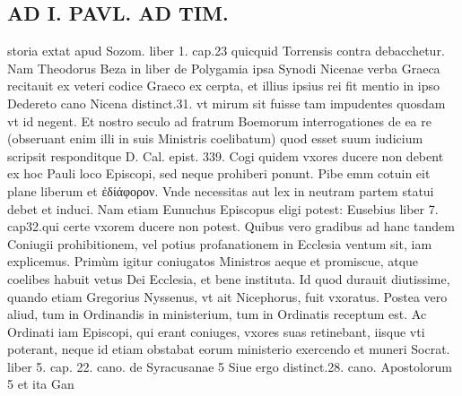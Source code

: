 \documentclass{article}
\begin{document}
\begin{pages}
\section*{AD I. PAVL. AD TIM. }
\marginpar{[ p.112 ]}\pstart storia extat apud Sozom. liber  1. cap.23 quicquid Torrensis contra debacchetur. Nam Theodorus Beza in liber  de Polygamia ipsa Synodi Nicenae verba Graeca recitauit ex veteri codice Graeco ex cerpta, et illius ipsius rei fit mentio in ipso Dedereto cano Nicena distinct.31. vt mirum sit fuisse tam impudentes quosdam vt id negent. Et nostro seculo ad fratrum Boemorum interrogationes de ea re (obseruant enim illi in suis Ministris coelibatum) quod esset suum iudicium scripsit responditque D. Cal. epist. 339.  \pend\pstart Cogi quidem vxores ducere non debent ex hoc Pauli loco Episcopi, sed neque prohiberi ponunt. Pibe emm cotuin eit plane liberum et ἐδίάφορον. Vnde necessitas aut lex in neutram partem statui debet et induci. Nam etiam Eunuchus Episcopus eligi potest: Eusebius liber  7. cap32.qui certe vxorem ducere non potest.  \pend\pstart Quibus vero gradibus ad hanc tandem Coniugii prohibitionem, vel potius profanationem in Ecclesia ventum sit, iam explicemus.  \pend\pstart Primùm igitur coniugatos Ministros aeque et promiscue, atque coelibes habuit vetus Dei Ecclesia, et bene instituta. Id quod durauit diutissime, quando etiam Gregorius Nyssenus, vt ait Nicephorus, fuit vxoratus.  \pend\pstart Postea vero aliud, tum in Ordinandis in ministerium, tum in Ordinatis receptum est. Ac Ordinati iam Episcopi, qui erant coniuges, vxores suas retinebant, iisque vti poterant, neque id etiam obstabat eorum ministerio exercendo et muneri Socrat. liber 5. cap. 22. cano. de Syracusanae 5 Siue ergo distinct.28. cano. Apostolorum 5 et ita Gan\pend

\end{pages}
\end{document}
